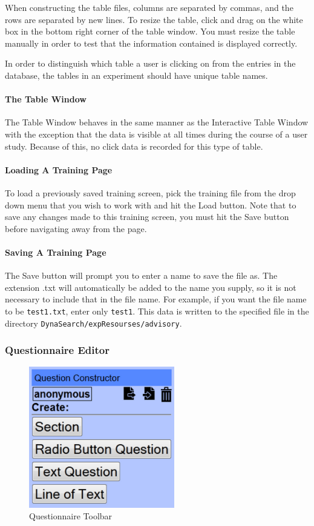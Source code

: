 \documentclass[article]{ij4uq}              %
\begin{document}
When constructing the table files, columns are separated by commas, and the rows are separated by new lines. To resize the table, click and drag on the white box in the bottom right corner of the table window. You must resize the table manually in order to test that the information contained is displayed correctly.

In order to distinguish which table a user is clicking on from the entries in the database, the tables in an experiment should have unique table names.

\paragraph{The Table Window}

The Table Window behaves in the same manner as the Interactive Table Window with the exception that the data is visible at all times during the course of a user study.  Because of this, no click data is recorded for this type of table.

\paragraph{Loading A Training Page}
To load a previously saved training screen, pick the training file from the drop down menu that you wish to work with and hit the Load button. Note that to save any changes made to this training screen, you must hit the Save button before navigating away from the page.

\paragraph{Saving A Training Page}
The Save button will prompt you to enter a name to save the file as. The extension .txt will automatically be added to the name you supply, so it is not necessary to include that in the file name. For example, if you want the file name to be \texttt{test1.txt}, enter only \texttt{test1}.  This data is written to the specified file in the directory \texttt{DynaSearch/expResourses/advisory}.



\subsubsection {Questionnaire Editor}

\begin{figure}[h!]
 \centering
 \includegraphics[width=2.5in]{figures/question_toolbar.png}
 \caption{Questionnaire Toolbar}
 \label{fig:questTool}
\end{figure}
\FloatBarrier
\end{document}
